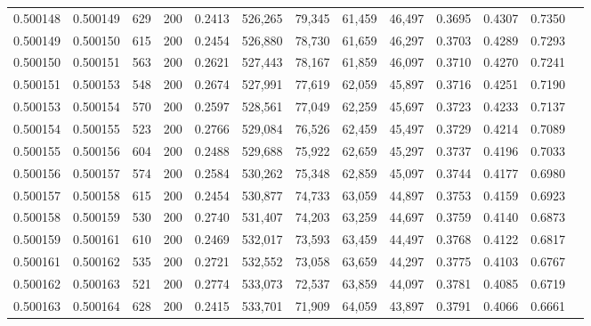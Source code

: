 \begin{tabular}{rrrrrrrrrrrrr}
0.500148 & 0.500149 &    629 & 200 &                                     0.2413 & 526,265 &  79,345 &  61,459 &  46,497 & 0.3695 & 0.4307 & 0.7350 \\
0.500149 & 0.500150 &    615 & 200 &                                     0.2454 & 526,880 &  78,730 &  61,659 &  46,297 & 0.3703 & 0.4289 & 0.7293 \\
0.500150 & 0.500151 &    563 & 200 &                                     0.2621 & 527,443 &  78,167 &  61,859 &  46,097 & 0.3710 & 0.4270 & 0.7241 \\
0.500151 & 0.500153 &    548 & 200 &                                     0.2674 & 527,991 &  77,619 &  62,059 &  45,897 & 0.3716 & 0.4251 & 0.7190 \\
0.500153 & 0.500154 &    570 & 200 &                                     0.2597 & 528,561 &  77,049 &  62,259 &  45,697 & 0.3723 & 0.4233 & 0.7137 \\
0.500154 & 0.500155 &    523 & 200 &                                     0.2766 & 529,084 &  76,526 &  62,459 &  45,497 & 0.3729 & 0.4214 & 0.7089 \\
0.500155 & 0.500156 &    604 & 200 &                                     0.2488 & 529,688 &  75,922 &  62,659 &  45,297 & 0.3737 & 0.4196 & 0.7033 \\
0.500156 & 0.500157 &    574 & 200 &                                     0.2584 & 530,262 &  75,348 &  62,859 &  45,097 & 0.3744 & 0.4177 & 0.6980 \\
0.500157 & 0.500158 &    615 & 200 &                                     0.2454 & 530,877 &  74,733 &  63,059 &  44,897 & 0.3753 & 0.4159 & 0.6923 \\
0.500158 & 0.500159 &    530 & 200 &                                     0.2740 & 531,407 &  74,203 &  63,259 &  44,697 & 0.3759 & 0.4140 & 0.6873 \\
0.500159 & 0.500161 &    610 & 200 &                                     0.2469 & 532,017 &  73,593 &  63,459 &  44,497 & 0.3768 & 0.4122 & 0.6817 \\
0.500161 & 0.500162 &    535 & 200 &                                     0.2721 & 532,552 &  73,058 &  63,659 &  44,297 & 0.3775 & 0.4103 & 0.6767 \\
0.500162 & 0.500163 &    521 & 200 &                                     0.2774 & 533,073 &  72,537 &  63,859 &  44,097 & 0.3781 & 0.4085 & 0.6719 \\
0.500163 & 0.500164 &    628 & 200 &                                     0.2415 & 533,701 &  71,909 &  64,059 &  43,897 & 0.3791 & 0.4066 & 0.6661 \\

\end{tabular}
